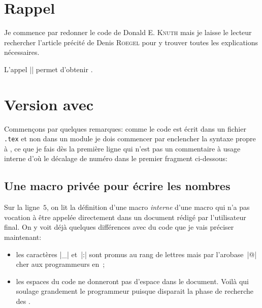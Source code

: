 \section{Rappel}
\label{sec:rappel}

Je commence par redonner le code de Donald E. \textsc{Knuth} mais je
laisse le lecteur rechercher l'article précité de Denis \textsc{Roegel}
pour y trouver toutes les explications nécessaires.


L'appel || permet d'obtenir
\og {}\fg.

\section{Version avec \Expliii}
\label{sec:versionexpl3}


Commençons par quelques remarques: comme le code est écrit dans un
fichier \texttt{.tex} \TO et non dans un \gls{module} \TF je dois
commencer par enclencher la syntaxe propre à \Expliii{}, ce que je
fais dès la première ligne qui n'est pas un commentaire à usage
interne \TO d'où le décalage de numéro \TF dans le premier fragment
ci-dessous:
%

\subsection{Une macro privée pour écrire les nombres}
\label{sec:macro+ecrire+entier}

Sur la ligne~\(5\), on lit la définition d'une macro \emph{interne}
\CAD d'une macro qui n'a pas vocation à être appelée directement dans
un document rédigé par l'utilisateur final. On y voit déjà quelques
différences avec du code \LaTeXe{} que je vais préciser maintenant:
\begin{itemize}
\item les caractères |_| et~|:| sont promus au rang de lettres mais
  par l'arobase~|@| cher aux programmeurs en~\LaTeXe{};
  
\item les espaces du code ne donneront pas d'espace dans le
  document. Voilà qui soulage grandement le programmeur puisque
  disparait la phase de recherche des .
\end{itemize}

